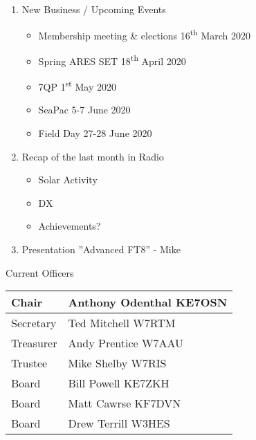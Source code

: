 \documentclass[letter,11pt]{extarticle}
\begin{document}
\begin{enumerate}
		\item  New Business / Upcoming Events
			\begin{itemize}
				\item Membership meeting \& elections 16\textsuperscript{th} March 2020
				\item Spring ARES SET 18\textsuperscript{th} April 2020
				\item 7QP 1\textsuperscript{st} May 2020	
				\item SeaPac 5-7 June 2020
				\item Field Day 27-28 June 2020
			\end{itemize}
		\item Recap of the last month in Radio
			\begin{itemize}
				\item Solar Activity
				\item DX
				\item Achievements?
			\end{itemize}
		\item  Presentation ''Advanced FT8'' - Mike

	\end{enumerate}


	Current Officers \\
	\begin{tabular}{|l|l|} \hline
		Chair & Anthony Odenthal KE7OSN \\ \hline
		Secretary & Ted Mitchell W7RTM \\ \hline
		Treasurer & Andy Prentice W7AAU \\ \hline
		Trustee & Mike Shelby W7RIS   \\ \hline
		Board & Bill Powell KE7ZKH \\ \hline
		Board & Matt Cawrse KF7DVN \\ \hline
		Board & Drew Terrill W3HES\\ \hline
	\end{tabular}
	
	\subsection*{}
	
\end{document}
